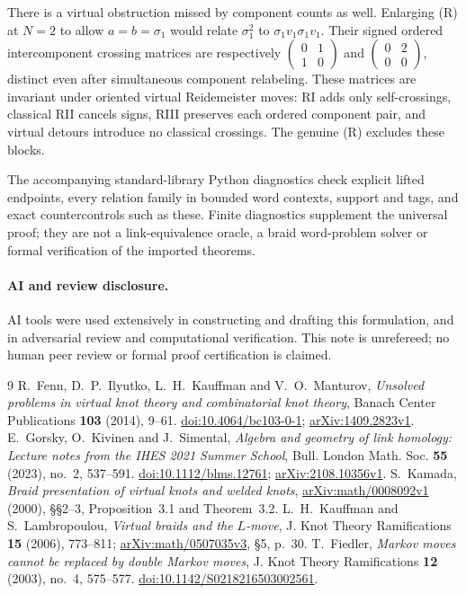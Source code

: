 \documentclass[11pt]{article}
\newcommand{\sig}{\sigma}
\begin{document}
There is a virtual obstruction missed by component counts as well. Enlarging
(R) at $N=2$ to allow $a=b=\sig_1$ would relate $\sig_1^2$ to
$\sig_1v_1\sig_1v_1$. Their signed ordered intercomponent crossing matrices are
respectively $\left(\begin{smallmatrix}0&1\\1&0\end{smallmatrix}\right)$ and
$\left(\begin{smallmatrix}0&2\\0&0\end{smallmatrix}\right)$, distinct even after
simultaneous component relabeling. These matrices are invariant under oriented
virtual Reidemeister moves: RI adds only self-crossings, classical RII cancels
signs, RIII preserves each ordered component pair, and virtual detours introduce
no classical crossings.
The genuine (R) excludes these blocks.

The accompanying standard-library Python diagnostics check explicit lifted
endpoints, every relation family in bounded word contexts, support and tags,
and exact countercontrols such as these. Finite diagnostics supplement the
universal proof; they are not a link-equivalence oracle, a braid word-problem
solver or formal verification of the imported theorems.

\paragraph{AI and review disclosure.}
AI tools were used extensively in constructing and drafting this formulation,
and in adversarial review and computational verification. This note is
unrefereed; no human peer review or formal proof certification is claimed.

\begingroup
\small
\begin{thebibliography}{9}
 R.~Fenn, D.~P.~Ilyutko, L.~H.~Kauffman and V.~O.~Manturov,
\emph{Unsolved problems in virtual knot theory and combinatorial knot theory},
Banach Center Publications \textbf{103} (2014), 9--61.
\href{https://doi.org/10.4064/bc103-0-1}{doi:10.4064/bc103-0-1};
\href{https://arxiv.org/abs/1409.2823v1}{arXiv:1409.2823v1}.
 E.~Gorsky, O.~Kivinen and J.~Simental,
\emph{Algebra and geometry of link homology: Lecture notes from the IHES 2021 Summer School},
Bull. London Math. Soc. \textbf{55} (2023), no.~2, 537--591.
\href{https://doi.org/10.1112/blms.12761}{doi:10.1112/blms.12761};
\href{https://arxiv.org/abs/2108.10356v1}{arXiv:2108.10356v1}.
 S.~Kamada,
\emph{Braid presentation of virtual knots and welded knots},
\href{https://arxiv.org/abs/math/0008092v1}{arXiv:math/0008092v1} (2000),
\S\S2--3, Proposition~3.1 and Theorem~3.2.
 L.~H.~Kauffman and S.~Lambropoulou,
\emph{Virtual braids and the $L$-move},
J. Knot Theory Ramifications \textbf{15} (2006), 773--811;
\href{https://arxiv.org/abs/math/0507035v3}{arXiv:math/0507035v3}, \S5, p.~30.
 T.~Fiedler,
\emph{Markov moves cannot be replaced by double Markov moves},
J. Knot Theory Ramifications \textbf{12} (2003), no.~4, 575--577.
\href{https://doi.org/10.1142/S0218216503002561}{doi:10.1142/S0218216503002561}.
\end{thebibliography}
\endgroup
\end{document}
